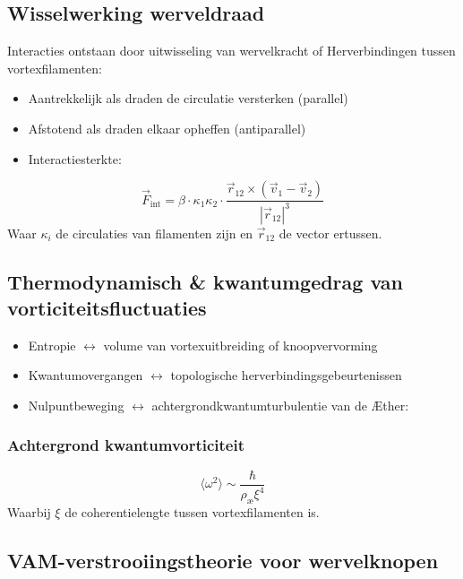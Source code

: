 \subsection{Wisselwerking werveldraad}
Interacties ontstaan door uitwisseling van wervelkracht of Herverbindingen tussen vortexfilamenten:
\begin{itemize}
\item Aantrekkelijk als draden de circulatie versterken (parallel)
\item Afstotend als draden elkaar opheffen (antiparallel)
\item Interactiesterkte:
\end{itemize}
\begin{equation}
\vec{F}_{\text{int}} = \beta \cdot \kappa_1 \kappa_2 \cdot \frac{\vec{r}_{12} \times (\vec{v}_1 - \vec{v}_2)}{|\vec{r}_{12}|^3}\label{eq:interaction_strength}
\end{equation}
Waar \(\kappa_i\) de circulaties van filamenten zijn en \(\vec{r}_{12}\) de vector ertussen.

\subsection{Thermodynamisch & kwantumgedrag van vorticiteitsfluctuaties}
\begin{itemize}
\item Entropie \(\leftrightarrow\) volume van vortexuitbreiding of knoopvervorming
\item Kwantumovergangen \(\leftrightarrow\) topologische herverbindingsgebeurtenissen
\item Nulpuntbeweging \(\leftrightarrow\) achtergrondkwantumturbulentie van de Æther:
\end{itemize}

\subsubsection*{Achtergrond kwantumvorticiteit}
\begin{equation}
\langle \omega^2 \rangle \sim \frac{\hbar}{\rho_\text{æ} \xi^4}\label{eq:quantum_vorticity_background}
\end{equation}
Waarbij \(\xi\) de coherentielengte tussen vortexfilamenten is.

\subsection{VAM-verstrooiingstheorie voor wervelknopen}

